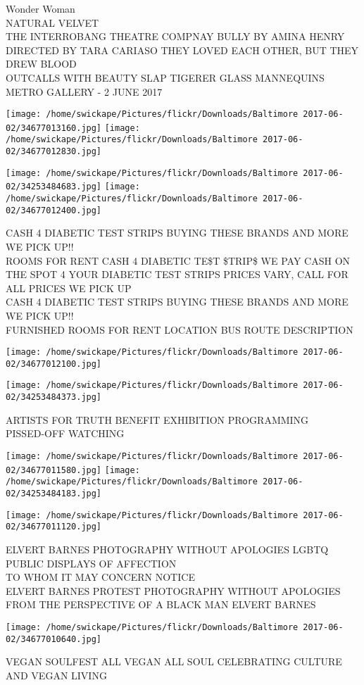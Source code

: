 \documentclass[10pt,letterpaper]{article}
\begin{document}
Wonder Woman\\
NATURAL VELVET\\
THE INTERROBANG THEATRE COMPNAY BULLY BY AMINA HENRY DIRECTED BY TARA CARIASO THEY LOVED EACH OTHER, BUT THEY DREW BLOOD\\
OUTCALLS WITH BEAUTY SLAP TIGERER GLASS MANNEQUINS METRO GALLERY {-} 2 JUNE 2017
\pagebreak

\texttt{[image: /home/swickape/Pictures/flickr/Downloads/Baltimore 2017-06-02/34677013160.jpg]}
\texttt{[image: /home/swickape/Pictures/flickr/Downloads/Baltimore 2017-06-02/34677012830.jpg]}

\texttt{[image: /home/swickape/Pictures/flickr/Downloads/Baltimore 2017-06-02/34253484683.jpg]}
\texttt{[image: /home/swickape/Pictures/flickr/Downloads/Baltimore 2017-06-02/34677012400.jpg]}

CASH 4 DIABETIC TEST STRIPS BUYING THESE BRANDS AND MORE WE PICK UP!!\\
ROOMS FOR RENT CASH 4 DIABETIC TE\$T \$TRIP\$ WE PAY CASH ON THE SPOT 4 YOUR DIABETIC TEST STRIPS PRICES VARY, CALL FOR ALL PRICES WE PICK UP\\
CASH 4 DIABETIC TEST STRIPS BUYING THESE BRANDS AND MORE WE PICK UP!!\\
FURNISHED ROOMS FOR RENT LOCATION BUS ROUTE DESCRIPTION
\pagebreak

\texttt{[image: /home/swickape/Pictures/flickr/Downloads/Baltimore 2017-06-02/34677012100.jpg]}

\vspace{0.25in}
\texttt{[image: /home/swickape/Pictures/flickr/Downloads/Baltimore 2017-06-02/34253484373.jpg]}

ARTISTS FOR TRUTH BENEFIT EXHIBITION PROGRAMMING\\
PISSED{-}OFF WATCHING
\pagebreak

\texttt{[image: /home/swickape/Pictures/flickr/Downloads/Baltimore 2017-06-02/34677011580.jpg]}
\texttt{[image: /home/swickape/Pictures/flickr/Downloads/Baltimore 2017-06-02/34253484183.jpg]}

\texttt{[image: /home/swickape/Pictures/flickr/Downloads/Baltimore 2017-06-02/34677011120.jpg]}

ELVERT BARNES PHOTOGRAPHY WITHOUT APOLOGIES LGBTQ PUBLIC DISPLAYS OF AFFECTION\\
TO WHOM IT MAY CONCERN NOTICE\\
ELVERT BARNES PROTEST PHOTOGRAPHY WITHOUT APOLOGIES FROM THE PERSPECTIVE OF A BLACK MAN ELVERT BARNES
\pagebreak

\texttt{[image: /home/swickape/Pictures/flickr/Downloads/Baltimore 2017-06-02/34677010640.jpg]}

VEGAN SOULFEST ALL VEGAN ALL SOUL CELEBRATING CULTURE AND VEGAN LIVING
\pagebreak
\end{document}
